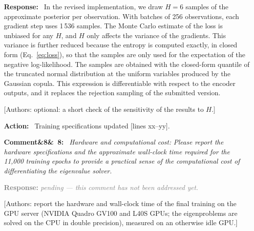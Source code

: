 \documentclass[11pt]{article}
\newenvironment{rcomment}[1]{\par\bigskip\noindent\textbf{Comment\ifx&#1&\else\ #1\fi:}\ \itshape}{\par}
\newenvironment{response}{\par\smallskip\noindent\color{resp}\textbf{Response:}\ }{\par}
\newenvironment{action}{\par\smallskip\noindent\color{resp}\textbf{Action:}\ }{\par}
\newcommand{\pending}{\par\smallskip\noindent\textcolor{gray}{\textbf{Response:} \textit{pending --- this comment
has not been addressed yet.}}\par}
\newcommand{\authornote}[1]{\textcolor{note}{\textsf{[Authors: #1]}}}
\newcommand{\tbd}[1]{\textcolor{note}{\textsf{[#1]}}}
\newcommand{\lines}[1]{\tbd{lines #1}}
\begin{document}
\begin{response}
In the revised implementation, we draw $H=6$ samples of the approximate posterior per observation. With batches of 256
observations, each gradient step uses 1\,536 samples. The Monte Carlo estimate of the loss is unbiased for any $H$, and
$H$ only affects the variance of the gradients. This variance is further reduced because the entropy is computed
exactly, in closed form (Eq.~\eqref{eq:loss}), so that the samples are only used for the expectation of the negative
log-likelihood. The samples are obtained with the closed-form quantile of the truncated normal distribution at the uniform
variables produced by the Gaussian copula. This expression is differentiable with respect to the encoder outputs, and it
replaces the rejection sampling of the submitted version.
\end{response}
\authornote{optional: a short check of the sensitivity of the results to $H$.}

\begin{action}
Training specifications updated \lines{xx--yy}.
\end{action}

\begin{rcomment}{8}
Hardware and computational cost: Please report the hardware specifications and the approximate wall-clock time
required for the 11,000 training epochs to provide a practical sense of the computational cost of differentiating the
eigenvalue solver.
\end{rcomment}
\pending
\authornote{report the hardware and wall-clock time of the final training on the GPU server (NVIDIA Quadro GV100 and L40S GPUs; the eigenproblems are solved on the CPU in double precision), measured on an otherwise idle GPU.}

\appendix
\end{document}
